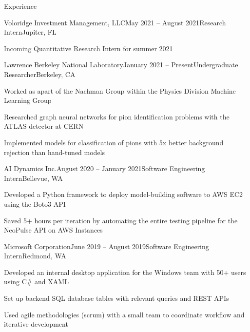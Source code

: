 \documentclass{resume} %
\begin{document}
\begin{rSection}{Experience}

\begin{rSubsection}{Voloridge Investment Management, LLC}{May 2021 – August 2021}{Research Intern}{Jupiter, FL}
\item Incoming Quantitative Research Intern for summer 2021
\end{rSubsection}

\begin{rSubsection}{Lawrence Berkeley National Laboratory}{January 2021 – Present}{Undergraduate Researcher}{Berkeley, CA}
\item Worked as apart of the Nachman Group within the Physics Division Machine Learning Group
\item Researched graph neural networks for pion identification problems with the ATLAS detector at CERN
\item Implemented models for classification of pions with 5x better background rejection than hand-tuned models
\end{rSubsection}

\begin{rSubsection}{AI Dynamics Inc.}{August 2020 – January 2021}{Software Engineering Intern}{Bellevue, WA}
\item Developed a Python framework to deploy model-building software to AWS EC2 using the Boto3 API
\item Saved 5+ hours per iteration by automating the entire testing pipeline for the NeoPulse API on AWS Instances
\end{rSubsection}

\begin{rSubsection}{Microsoft Corporation}{June 2019 – August 2019}{Software Engineering Intern}{Redmond, WA}
\item Developed an internal desktop application for the Windows team with 50+ users using C\# and XAML
\item Set up backend SQL database tables with relevant queries and REST APIs
\item Used agile methodologies (scrum) with a small team to coordinate workflow and iterative development
\end{rSubsection}

\end{rSection}

\end{document}
